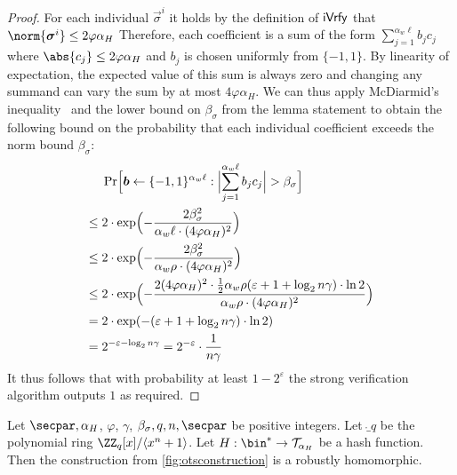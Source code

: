 \begin{proof}
  For each individual $\vec{\sigma}^i$ it holds by the definition of $\mathsf{iVrfy}$ that
    $\norm{\vec{\sigma}^i} \leq 2\varphi\alpha_H$
  Therefore, each coefficient is a sum of the form
  \(
    \sum_{j=1}^{\alpha_w\ell}b_j c_j
  \)
  where $\abs{c_j}\leq 2\varphi\alpha_H$ and $b_j$ is chosen uniformly from $\{-1,1\}$.
  By linearity of expectation, the expected value of this sum is always zero and changing any summand can vary the sum by at most $4\varphi\alpha_H$. We can thus apply McDiarmid's inequality~\cite{McDiarmid89} and the lower bound on $\beta_\sigma$ from the lemma statement to obtain the following bound on the probability that each individual coefficient exceeds the norm bound $\beta_\sigma$:
  \begin{align*}
    &\Pr\Bigl[\vec{b}\gets\{-1,1\}^{\alpha_w\ell} : \Bigl|\smashoperator{\sum_{j=1}^{\alpha_w\ell}}b_j c_j\Bigr| > \beta_\sigma\Bigr]\\
    \leq{}& 2\cdot\exp\Bigl(-\frac{2\beta_\sigma^2}{\alpha_w\ell\cdot (4\varphi\alpha_H)^2}\Bigr)\\
    \leq{}& 2\cdot\exp\Bigl(-\frac{2\beta_\sigma^2}{\alpha_w\rho\cdot (4\varphi\alpha_H)^2}\Bigr)\\
    \leq{}& 2\cdot\exp\Bigl(-\frac{2(4\varphi\alpha_H)^2\cdot\tfrac{1}{2}\alpha_w\rho(\varepsilon+1+\log_2n\gamma)\cdot\ln2}{\alpha_w\rho\cdot (4\varphi\alpha_H)^2}\Bigr)\\
    ={}& 2\cdot\exp(-(\varepsilon+1+\log_2n\gamma)\cdot\ln2)\\
    ={}& 2^{-\varepsilon-\log_2n\gamma} = 2^{-\varepsilon}\cdot \frac{1}{n\gamma}
  \end{align*}
  It thus follows that with probability at least $1-2^\varepsilon$ the strong verification algorithm outputs $1$ as required.
\end{proof}


\begin{lemma}\label{lem:kots_homomorphic}
  Let $\secpar, \alpha_H$, $\varphi$, $\gamma$, $\beta_\sigma,q,n,\secpar$ be positive integers.
  Let $\ring_q$ be the polynomial ring $\ZZ_q[x]/\langle x^n+1\rangle$.
  Let $H : \bin^* \to \tern_{\alpha_H}$ be a hash function.
  Then the construction from \autoref{fig:otsconstruction} is a robustly homomorphic.
\end{lemma}

